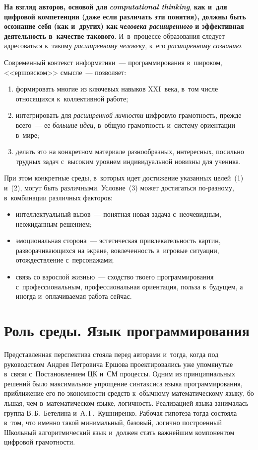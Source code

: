 \begin{multicols}{2}
 \textbf{На  взгляд авторов, основой для} {\bfseries\textit{computational 
thinking}}, \textbf{как и~для цифровой компетенции (даже если различать 
эти понятия), должны быть осознание себя (как и~других) как} 
{\bfseries\textit{человека расширенного}} \textbf{и эффективная 
деятельность в~качестве такового}. И~в~процессе образования  следует 
адресоваться к~такому \textit{расширенному человеку}, к~его 
\textit{расширенному сознанию}.
  
  Современный контекст информатики~--- программирования в~широком, 
<<ершовском>> смысле~--- позволяет:
  \begin{enumerate}[(1)]
  \item формировать многие из ключевых навыков XXI~века, в~том числе 
относящихся к~коллективной работе;
\columnbreak

\item интегрировать для \textit{расширенной личности} циф\-ро\-вую грамотность, 
прежде всего~--- ее \textit{большие идеи}, в~общую грамотность и~систему 
ориентации в~мире; 
\item делать это на конкретном материале разнообразных, интересных, 
посильно трудных задач с~высоким уровнем индивидуальной новизны для 
ученика.
\end{enumerate}
%
  При этом конкретные среды, в~которых идет достижение указанных 
целей~(1) и~(2), могут быть различными. Условие~(3) может достигаться 
по-раз\-но\-му, в~комбинации различных факторов:
  \begin{itemize}
\item интеллектуальный вызов~--- понятная новая задача с~неочевидным, 
неожиданным решением;
\item эмоциональная сторона~--- эстетическая привлекательность картин, 
разворачивающихся на экране, вовлеченность в~игровые ситуации, 
отождествление с~персонажами;
\item связь со взрослой жизнью~--- сходство твоего программирования 
с~профессиональным, профессиональная ориентация, польза в~будущем, а 
иногда и~оплачиваемая работа сейчас.
  \end{itemize}
  
\section{Роль среды. Язык программирования}

  Представленная перспектива стояла перед  авторами и~тогда, когда под 
руководством Андрея Петровича Ершова  проектировались уже упомянутые 
в~связи с~Постановлением ЦК и~СМ процессы. Одним из принципиальных 
решений было максимальное упрощение синтаксиса языка 
программирования, приближение его по экономности средств к~обычному 
математическому языку, б$\acute{\mbox{о}}$льшая, чем в~математическом 
языке, логичность. Реализацией языка занималась группа В.\,Б.~Бетелина 
и~А.\,Г.~Кушниренко.  Рабочая гипотеза тогда состояла в~том, что именно такой 
минимальный, базовый, логично построенный Школьный алгоритмический 
язык и~должен  стать важнейшим компонентом цифровой грамотности.
  

\end{multicols}
